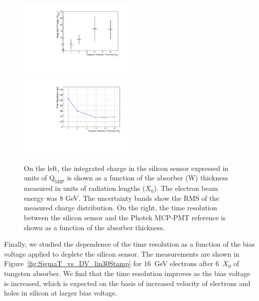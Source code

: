 \begin{figure}[htbp] 
\centering
\includegraphics[width=0.49\textwidth]{plots/MIPVsAbsorberAt8GeV.pdf} 
\includegraphics[width=0.5\textwidth]{plots/SigmaT_vs_X0_lin30Stamp.pdf} 
\caption{On the left, the integrated charge in the silicon sensor expressed in
units of $\mathrm{Q}_{\mathrm{MIP}}$ is shown as a function of the absorber (W)
thickness measured in units of radiation lengths ($X_{0}$). The electron beam
energy was 8 GeV. The uncertainty bands show the RMS of the measured charge
distribution. On the right, the time resolution between the silicon sensor and
the Photek MCP-PMT reference is shown as a function of the absorber thickness. } 
\label{fig:MIPVsAbsorberAt8GeV} 
\end{figure} 

Finally, we studied the dependence of the time resolution as a function of the
bias voltage applied to deplete the silicon sensor. The measurements are shown
in Figure~\ref{fig:SigmaT_vs_DV_lin30Stamp} for $16$~GeV electrons after
6~$X_0$ of tungsten absorber. We find that the time resolution
improves as the bias voltage is increased, which is expected on the basis of 
increased velocity of electrons and holes in silicon at larger bias voltage. 

